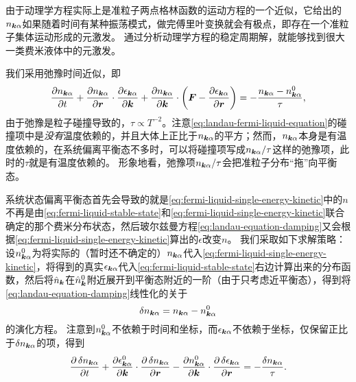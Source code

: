由于动理学方程实际上是准粒子两点格林函数的运动方程的一个近似，它给出的$n_{\vb*{k} \alpha}$如果随着时间有某种振荡模式，做完傅里叶变换就会有极点，即存在一个准粒子集体运动形成的元激发。
通过分析动理学方程的稳定周期解，就能够找到很大一类费米液体中的元激发。

我们采用弛豫时间近似，即
\begin{equation}
    \pdv{n_{\vb*{k} \alpha}}{t} + \pdv{n_{\vb*{k} \alpha}}{\vb*{r}} \cdot \pdv{\epsilon_{\vb*{k} \alpha}}{\vb*{k}} + \pdv{n_{\vb*{k} \alpha}}{\vb*{k}} \cdot \left( \vb*{F} - \pdv{\epsilon_{\vb*{k} \alpha}}{\vb*{r}} \right) = - \frac{n_{\vb*{k} \alpha} - n_{\vb*{k} \alpha}^0}{\tau},
    \label{eq:landau-equation-damping}
\end{equation}
由于弛豫是粒子碰撞导致的，$\tau \propto T^{-2}$。注意\eqref{eq:landau-fermi-liquid-equation}的碰撞项中是\emph{没有}温度依赖的，并且大体上正比于$n_{\vb*{k} \alpha}$的平方；然而，$n_{\vb*{k} \alpha}$本身是有温度依赖的，在系统偏离平衡态不多时，可以将碰撞项写成$n_{\vb*{k} \alpha} / \tau$这样的弛豫项，此时的$\tau$就是有温度依赖的。
形象地看，弛豫项$n_{\vb*{k} \alpha} / \tau$会把准粒子分布“拖”向平衡态。

系统状态偏离平衡态首先会导致的就是\eqref{eq:fermi-liquid-single-energy-kinetic}中的$n$不再是由\eqref{eq:fermi-liquid-stable-state}和\eqref{eq:fermi-liquid-single-energy-kinetic}联合确定的那个费米分布状态，然后玻尔兹曼方程\eqref{eq:landau-equation-damping}又会根据\eqref{eq:fermi-liquid-single-energy-kinetic}算出的$\epsilon$改变$n$。
我们采取如下求解策略：设${n}^0_{\vb*{k} \alpha}$为将实际的（暂时还不确定的）${n}_{\vb*{k} \alpha}$代入\eqref{eq:fermi-liquid-single-energy-kinetic}，将得到的真实$\epsilon_{\vb*{k} \alpha}$代入\eqref{eq:fermi-liquid-stable-state}右边计算出来的分布函数，然后将$\hat{n}_{\vb*{k}}$在$\hat{n}^0_{\vb*{k}}$附近展开到平衡态附近的一阶（由于只考虑近平衡态），得到将\eqref{eq:landau-equation-damping}线性化的关于
\begin{equation}
    \var{n_{\vb*{k} \alpha}} = n_{\vb*{k} \alpha} - n_{\vb*{k} \alpha}^0
\end{equation}
的演化方程。
注意到$n_{\vb*{k} \alpha}^0$不依赖于时间和坐标，而$\epsilon_{\vb*{k} \alpha}$不依赖于坐标，仅保留正比于$\var{n}_{\vb*{k} \alpha}$的项，得到
\begin{equation}
    \pdv{\var{n}_{\vb*{k} \alpha}}{t} + \pdv{\epsilon^0_{\vb*{k} \alpha}}{\vb*{k}} \cdot \pdv{\var{n_{\vb*{k} \alpha}}}{\vb*{r}} - \pdv{n^0_{\vb*{k} \alpha}}{\vb*{k}} \cdot \pdv{\var{\epsilon_{\vb*{k} \alpha}}}{\vb*{r}} = - \frac{\var{n}_{\vb*{k} \alpha}}{\tau}.
    \label{eq:delta-from-stable-fermi-liquid}
\end{equation}

